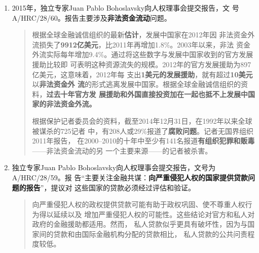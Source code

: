 \begin{enumerate}
\item 2015年，独立专家Juan Pablo Bohoslavsky向人权理事会提交报告，文
  号A/HRC/28/60。报告主要涉及\textbf{非法资金流动}问题。
  \begin{quotation}根据全球金融诚信组织的最新\textbf{估计}，发展中国家在2012年因
    非法资金外流损失了\textbf{9912亿美元}，比2011年再增加1.8\%。2003年以来，非法
    资金外流实际每年增加9.4\%。通过将这些数字与发展中国家收到的官方发展援助比较即
    可表明这种资源流失的规模。2012年的官方发展援助为897亿美元，这意味着，2012年每
    支出\textbf{1美元的发展援助}，就有超过\textbf{10美元}以\textbf{非法资金外
      流}的形式逃离发展中国家。根据全球金融诚信组织的资料，\textbf{过去十年官方发
      展援助和外国直接投资加在一起也抵不上发展中国家的非法资金外流。}

    根据保护记者委员会的资料，截至2014年12月31日，在1992年以来全球被谋杀的725记者
    中，有208人或29\%报道了\textbf{腐败问题}。记者无国界组织2011年报告，
    在2000--2010的十年中至少有141名报道\textbf{有组织犯罪和贩毒}——非法资金流动的另
    一个主要来源——的记者被杀害。
  \end{quotation}

\item 独立专家Juan Pablo Bohoslavsky向人权理事会提交报告，文号为A/HRC/28/59。报
  告“主要关注金融共谋：\textbf{向严重侵犯人权的国家提供贷款问题的报告}”，提议对
  这些国家的贷款必须经过评估和验证。
  \begin{quotation}
    向严重侵犯人权的政权提供贷款可能有助于政权巩固、使不尊重人权行为得以延续以及
    增加严重侵犯人权的可能性。这些结论对官方和私人对政府的金融援助都适用。然而，
    私人贷款似乎更具有破坏性，因为与国家间的贷款和由国际金融机构分配的贷款相比，
    私人贷款的公共问责程度较低。
  \end{quotation}
\end{enumerate}



